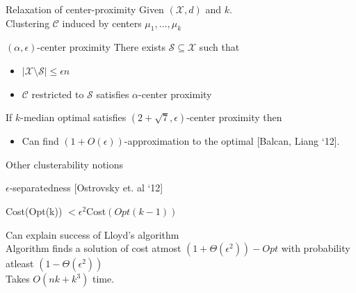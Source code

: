 \documentclass{beamer}
\newcommand{\mc}{\mathcal}
\begin{document}
\begin{frame}{Relaxation of center-proximity}
	Given $(\mc X, d)$ and $k$.\\
	\vspace{0.4cm}Clustering $\mc C$ induced by centers $\mu_1, \ldots, \mu_k$
	\vspace{0.5cm}\begin{block}{$(\alpha, \epsilon)$-center proximity}
		There exists $\mc S \subseteq \mc X$ such that 
		\begin{itemize}
			\vspace{0.3cm}\item $|\mc X \setminus \mc S| \le \epsilon n$
			\vspace{0.3cm}\item $\mc C$ restricted to $\mc S$ satisfies $\alpha$-center proximity
		\end{itemize}
	\end{block}
	
	\vspace{0.5cm}If $k$-median optimal satisfies $(2+\sqrt{7}, \epsilon)$-center proximity then 
	\begin{itemize}
		\item Can find $(1 + O(\epsilon))$-approximation to the optimal \alert{[Balcan, Liang `12]}.
	\end{itemize}
\end{frame}

\begin{frame}{Other clusterability notions}
	
	{\color{blue}$\epsilon$-separatedness} \alert{[Ostrovsky et. al `12]}\\
	\begin{center}Cost(Opt(k)) $< \epsilon^2$Cost$(Opt(k-1))$\end{center}

	\vspace{0.5cm}Can {\color{blue} explain success} of Lloyd's algorithm \\
	
	
	\vspace{1cm}Algorithm finds a solution of cost atmost $(1+\Theta(\epsilon^2))-Opt$ with probability atleast $(1-\Theta(\epsilon^2))$\\
	
	\vspace{0.5cm} Takes $O(nk + k^3)$ time.
	
\end{frame}
\end{document}
